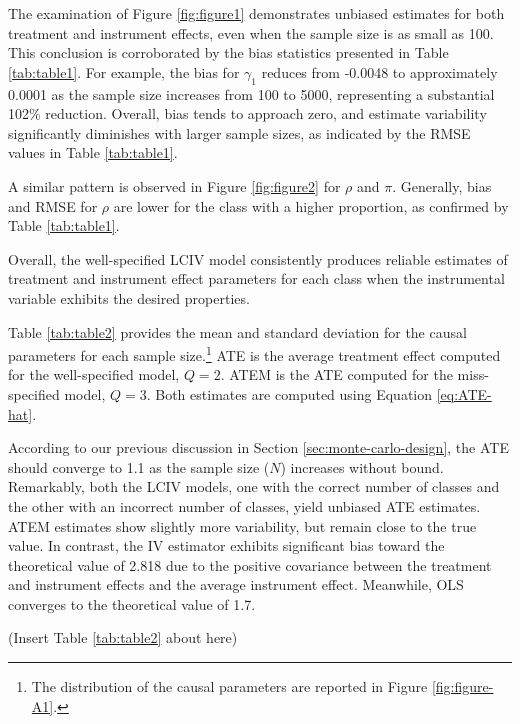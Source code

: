 \documentclass[12pt]{article}
\begin{document}
The examination of Figure \ref{fig:figure1} demonstrates unbiased estimates for both treatment and instrument effects, even when the sample size is as small as 100. This conclusion is corroborated by the bias statistics presented in Table \ref{tab:table1}. For example, the bias for $\gamma_1$ reduces from -0.0048 to approximately 0.0001 as the sample size increases from 100 to 5000, representing a substantial 102\% reduction. Overall, bias tends to approach zero, and estimate variability significantly diminishes with larger sample sizes, as indicated by the RMSE values in Table \ref{tab:table1}. 

A similar pattern is observed in Figure \ref{fig:figure2} for $\rho$ and $\pi$. Generally, bias and RMSE for $\rho$ are lower for the class with a higher proportion, as confirmed by Table \ref{tab:table1}. 

Overall, the well-specified LCIV model consistently produces reliable estimates of treatment and instrument effect parameters for each class when the instrumental variable exhibits the desired properties. %

Table \ref{tab:table2} provides the mean and standard deviation for the causal parameters for each sample size.\footnote{The distribution of the causal parameters are reported in Figure \ref{fig:figure-A1}.} ATE is the average treatment effect computed for the well-specified model, $Q = 2$. ATEM is the ATE computed for the miss-specified model, $Q = 3$. Both estimates are computed using Equation \eqref{eq:ATE-hat}. 

According to our previous discussion in Section \ref{sec:monte-carlo-design}, the ATE should converge to 1.1 as the sample size ($N$) increases without bound. Remarkably, both the LCIV models, one with the correct number of classes and the other with an incorrect number of classes, yield unbiased ATE estimates. ATEM estimates show slightly more variability, but remain close to the true value. In contrast, the IV estimator exhibits significant bias toward the theoretical value of 2.818 due to the positive covariance between the treatment and instrument effects and the average instrument effect. Meanwhile, OLS converges to the theoretical value of 1.7.

\begin{center}
	(Insert Table \ref{tab:table2} about here)
\end{center}
\end{document}
